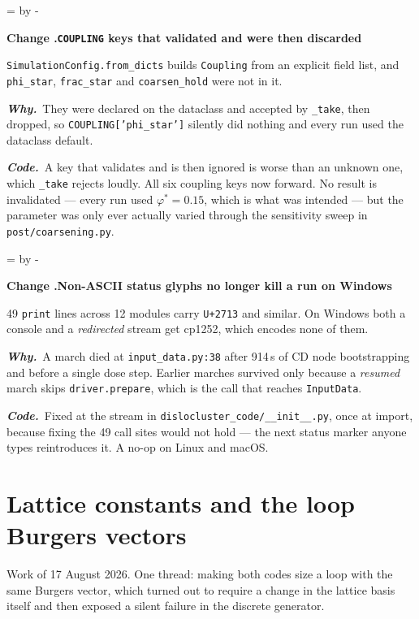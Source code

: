 \documentclass[11pt,a4paper]{article}
\newcommand{\code}[1]{\texttt{\small #1}}
\newcommand{\needlines}[1]{%
  \par\dimen0=\pagegoal \advance\dimen0 by -\pagetotal
  \ifdim\dimen0<#1\baselineskip \newpage \fi}
\newcounter{chg}
\newcommand{\change}[1]{%
  \needlines{4}%
  \refstepcounter{chg}%
  \par\medskip\noindent
  {\bfseries\boldmath Change \thechg.\quad #1}%
  \par\nobreak\smallskip}
\newcommand{\why}[1]{\par\noindent\textbf{\itshape Why.}\ #1\par}
\newcommand{\impact}[1]{\par\noindent\textbf{\itshape Code.}\ #1\par}
\begin{document}
\change{\code{COUPLING} keys that validated and were then discarded}
\label{chg:config-forward}
\code{SimulationConfig.from\_dicts} builds \code{Coupling} from an explicit
field list, and \code{phi\_star}, \code{frac\_star} and \code{coarsen\_hold}
were not in it.
\why{They were declared on the dataclass and accepted by \code{\_take}, then
dropped, so \code{COUPLING['phi\_star']} silently did nothing and every run used
the dataclass default.}
\impact{A key that validates and is then ignored is worse than an unknown one,
which \code{\_take} rejects loudly. All six coupling keys now forward. No
result is invalidated --- every run used $\varphi^\ast=0.15$, which is what was
intended --- but the parameter was only ever actually varied through the
sensitivity sweep in \code{post/coarsening.py}.}

\change{Non-ASCII status glyphs no longer kill a run on Windows}
\label{chg:stdio}
49 \code{print} lines across 12 modules carry \code{U+2713} and similar. On
Windows both a console and a \emph{redirected} stream get cp1252, which encodes
none of them.
\why{A march died at \code{input\_data.py:38} after 914\,s of CD node
bootstrapping and before a single dose step. Earlier marches survived only
because a \emph{resumed} march skips \code{driver.prepare}, which is the call
that reaches \code{InputData}.}
\impact{Fixed at the stream in \code{dislocluster\_code/\_\_init\_\_.py}, once
at import, because fixing the 49 call sites would not hold --- the next status
marker anyone types reintroduces it. A no-op on Linux and macOS.}

\part{Lattice constants and the loop Burgers vectors}
\label{part:burgers}

Work of 17 August 2026. One thread: making both codes size a loop with the same
Burgers vector, which turned out to require a change in the lattice basis itself
and then exposed a silent failure in the discrete generator.
\end{document}
